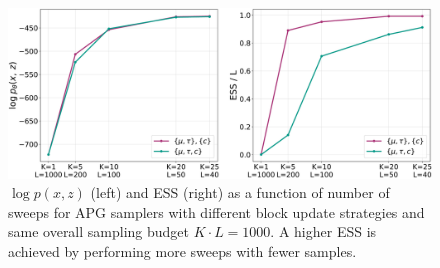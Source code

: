 \documentclass{article}
\theoremstyle{definition}
\begin{document}

\begin{figure}[t!]
\centering
\includegraphics[width=\columnwidth]{figures/budget_gmm.pdf}
  \caption{$\log p(x, z)$ (left) and ESS (right) as a function of number of sweeps for APG samplers with different block update strategies and same overall sampling budget $K \cdot L = 1000$. A higher ESS is achieved by performing more sweeps with fewer samples.}
  \label{fig:fixed-budget-gmm}
\end{figure}
\end{document}
